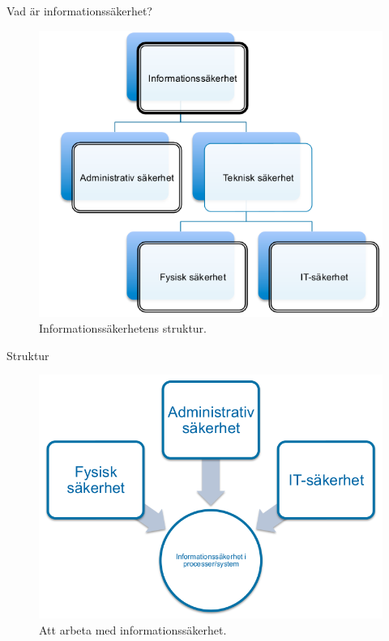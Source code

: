 \documentclass{beamer}
\begin{document}
\begin{frame}{Vad är informationssäkerhet?}
  \begin{figure}
    \includegraphics[height=0.7\textheight]{infosak-struktur.png}
    \caption{Informationssäkerhetens struktur.}
  \end{figure}
\end{frame}

\begin{frame}{Struktur}
  \begin{figure}
    \includegraphics[height=0.7\textheight]{infosak-process.png}
    \caption{Att arbeta med informationssäkerhet.}
  \end{figure}
\end{frame}
\end{document}

